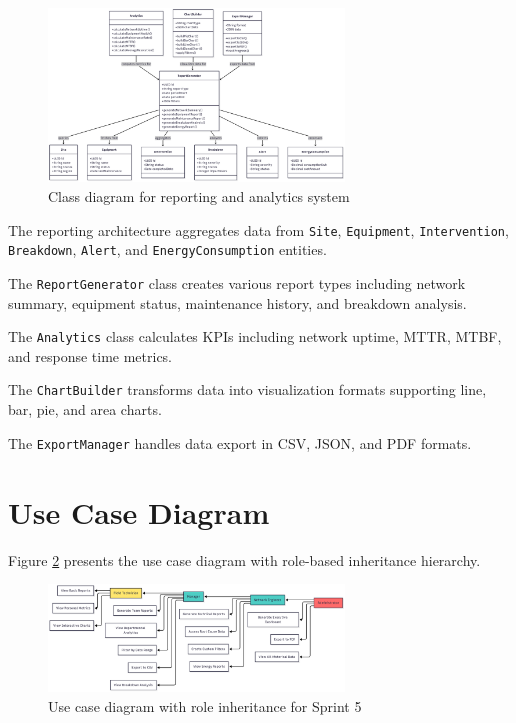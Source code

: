 \begin{figure}[H]
\centering
\includegraphics[width=0.7\textwidth]{img/chap_07/sprint5_class_diagram.png}
\caption{Class diagram for reporting and analytics system}
\label{fig:sprint5-class}
\end{figure}

The reporting architecture aggregates data from \texttt{Site}, \texttt{Equipment}, \texttt{Intervention}, \texttt{Breakdown}, \texttt{Alert}, and \texttt{EnergyConsumption} entities.

The \texttt{ReportGenerator} class creates various report types including network summary, equipment status, maintenance history, and breakdown analysis.

The \texttt{Analytics} class calculates KPIs including network uptime, MTTR, MTBF, and response time metrics.

The \texttt{ChartBuilder} transforms data into visualization formats supporting line, bar, pie, and area charts.

The \texttt{ExportManager} handles data export in CSV, JSON, and PDF formats.

\section{Use Case Diagram}

Figure \ref{fig:sprint5-usecase} presents the use case diagram with role-based inheritance hierarchy.

\begin{figure}[H]
\centering
\includegraphics[width=0.7\textwidth]{img/chap_07/sprint5_usecase_diagram.png}
\caption{Use case diagram with role inheritance for Sprint 5}
\label{fig:sprint5-usecase}
\end{figure}

